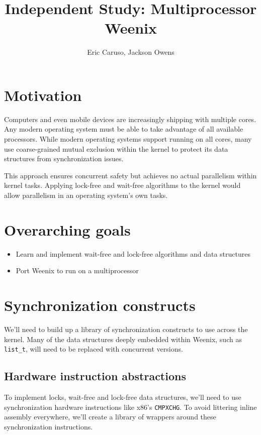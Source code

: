 \documentclass{article}
\begin{document}
\title{Independent Study: Multiprocessor Weenix}
\author{Eric Caruso, Jackson Owens}
\maketitle

\section{Motivation}

Computers and even mobile devices are increasingly shipping with multiple cores. Any modern
operating system must be able to take advantage of all available processors. While modern
operating systems support running on all cores, many use coarse-grained mutual exclusion 
within the kernel to protect its data structures from synchronization issues. %

This approach ensures concurrent safety but achieves no actual parallelism within kernel tasks. Applying 
lock-free and wait-free algorithms to the kernel would allow parallelism in an operating 
system's own tasks.

\section{Overarching goals}

\begin{itemize}
    \item Learn and implement wait-free and lock-free algorithms and data structures
    \item Port Weenix to run on a multiprocessor
\end{itemize}

\section{Synchronization constructs}

We'll need to build up a library of synchronization constructs to use across the kernel. Many of
the data structures deeply embedded within Weenix, such as {\tt{list\_t}}, will need to be
replaced with concurrent versions.

\subsection{Hardware instruction abstractions}

To implement locks, wait-free and lock-free data structures, we'll need to use synchronization 
hardware instructions like x86's {\tt{CMPXCHG}}. To avoid littering inline assembly everywhere,
we'll create a library of wrappers around these synchronization instructions.
\end{document}
